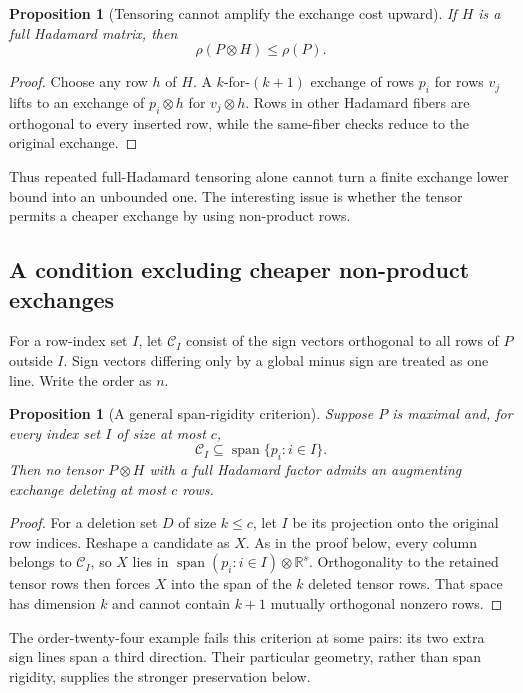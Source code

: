 \documentclass[11pt]{article}
\newtheorem{proposition}[theorem]{Proposition}
\newcommand{\R}{\mathbb R}
\begin{document}
\begin{proposition}[Tensoring cannot amplify the exchange cost upward]
If $H$ is a full Hadamard matrix, then
\[
 \rho(P\otimes H)\le\rho(P).
\]
\end{proposition}
\begin{proof}
Choose any row $h$ of $H$. A $k$-for-$(k+1)$ exchange of rows $p_i$
for rows $v_j$ lifts to an exchange of $p_i\otimes h$ for $v_j\otimes h$.
Rows in other Hadamard fibers are orthogonal to every inserted row,
while the same-fiber checks reduce to the original exchange.
\end{proof}
Thus repeated full-Hadamard tensoring alone cannot turn a finite
exchange lower bound into an unbounded one. The interesting issue is
whether the tensor permits a cheaper exchange by using non-product rows.

\subsection{A condition excluding cheaper non-product exchanges}
For a row-index set $I$, let $\mathcal C_I$ consist of the sign vectors
orthogonal to all rows of $P$ outside $I$. Sign vectors differing only
by a global minus sign are treated as one line. Write the order as $n$.

\begin{proposition}[A general span-rigidity criterion]
Suppose $P$ is maximal and, for every index set $I$ of size at most $c$,
\[
 \mathcal C_I\subseteq\operatorname{span}\{p_i:i\in I\}.
\]
Then no tensor $P\otimes H$ with a full Hadamard factor admits an
augmenting exchange deleting at most $c$ rows.
\end{proposition}
\begin{proof}
For a deletion set $D$ of size $k\le c$, let $I$ be its projection
onto the original row indices. Reshape a candidate as $X$. As in the
proof below, every column belongs to $\mathcal C_I$, so $X$ lies in
$\operatorname{span}(p_i:i\in I)\otimes\R^s$. Orthogonality to the
retained tensor rows then forces $X$ into the span of the $k$ deleted
tensor rows. That space has dimension $k$ and cannot contain $k+1$
mutually orthogonal nonzero rows.
\end{proof}
The order-twenty-four example fails this criterion at some pairs: its
two extra sign lines span a third direction. Their particular geometry,
rather than span rigidity, supplies the stronger preservation below.
\end{document}
